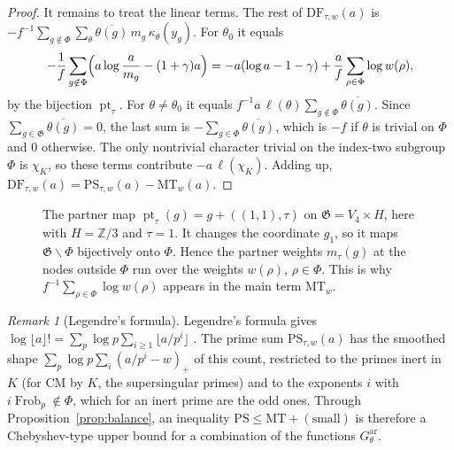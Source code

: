 \documentclass[11pt]{amsbook}
\theoremstyle{plain}
\theoremstyle{definition}
\theoremstyle{remark}
\newtheorem{remark}[theorem]{Remark}
\numberwithin{equation}{section}
\numberwithin{figure}{chapter}
\numberwithin{table}{chapter}
\newcommand{\Z}{\mathbb{Z}}
\newcommand{\Frob}{\operatorname{Frob}}
\newcommand{\GG}{\mathfrak{G}}
\newcommand{\pt}{\operatorname{pt}}
\newcommand{\GPsi}{G^{\mathrm{ar}}}
\newcommand{\PS}{\mathrm{PS}}
\newcommand{\MT}{\mathrm{MT}}
\newcommand{\DF}{\mathrm{DF}}
\begin{document}
\begin{proof}
It remains to treat the linear terms. The rest of $\DF_{\tau,w}(a)$ is
$-f^{-1}\sum_{g\notin\Phi}\sum_\theta\overline{\theta(g)}\,m_g\,
\kappa_\theta(y_g)$. For $\theta_0$ it equals
\[
-\frac1f\sum_{g\notin\Phi}\Bigl(a\log\frac a{m_g}-(1+\gamma)a\Bigr)
=-a(\log a-1-\gamma)+\frac af\sum_{\rho\in\Phi}\log w(\rho),
\]
by the bijection $\pt_\tau$. For $\theta\ne\theta_0$ it equals
$f^{-1}a\,\ell(\theta)\sum_{g\notin\Phi}\overline{\theta(g)}$. Since
$\sum_{g\in\GG}\overline{\theta(g)}=0$, the last sum is
$-\sum_{g\in\Phi}\overline{\theta(g)}$, which is $-f$ if $\theta$ is
trivial on $\Phi$ and $0$ otherwise. The only nontrivial character
trivial on the index-two subgroup $\Phi$ is $\chi_K$, so these terms
contribute $-a\,\ell(\chi_K)$. Adding up,
$\DF_{\tau,w}(a)=\PS_{\tau,w}(a)-\MT_w(a)$.
\end{proof}

\begin{figure}[htbp]
\centering

\caption{The partner map $\pt_\tau(g)=g+((1,1),\tau)$ on
$\GG=V_4\times H$, here with $H=\Z/3$ and $\tau=1$. It changes the
coordinate $g_1$, so it maps $\GG\smallsetminus\Phi$ bijectively onto
$\Phi$. Hence the partner weights $m_\tau(g)$ at the nodes outside
$\Phi$ run over the weights $w(\rho)$, $\rho\in\Phi$. This is why
$f^{-1}\sum_{\rho\in\Phi}\log w(\rho)$ appears in the main term
$\MT_w$.}
\label{fig:partner}
\end{figure}

\begin{remark}[Legendre's formula]\label{rem:legendre}
Legendre's formula gives $\log\lfloor a\rfloor!=\sum_p\log p
\sum_{i\ge1}\lfloor a/p^i\rfloor$ \cite{Legendre1808}. The prime sum
$\PS_{\tau,w}(a)$ has the smoothed shape
$\sum_p\log p\sum_i(a/p^i-w)_+$ of this count, restricted to the primes
inert in $K$ (for CM by $K$, the supersingular primes) and to the
exponents $i$ with $i\Frob_p\notin\Phi$, which for an inert prime are
the odd ones. Through Proposition~\ref{prop:balance}, an inequality
$\PS\le\MT+(\text{small})$ is therefore a Chebyshev-type upper bound
\cite{Chebyshev1852} for a combination of the functions $\GPsi_\theta$.
\end{remark}
\end{document}
